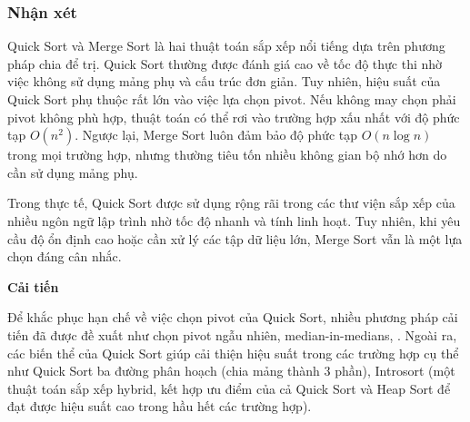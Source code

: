 \subsubsection{Nhận xét}

Quick Sort và Merge Sort là hai thuật toán sắp xếp nổi tiếng dựa trên phương pháp chia để trị. Quick Sort thường được đánh giá cao về tốc độ thực thi nhờ việc không sử dụng mảng phụ và cấu trúc đơn giản. Tuy nhiên, hiệu suất của Quick Sort phụ thuộc rất lớn vào việc lựa chọn pivot. Nếu không may chọn phải pivot không phù hợp, thuật toán có thể rơi vào trường hợp xấu nhất với độ phức tạp $O(n^2)$. Ngược lại, Merge Sort luôn đảm bảo độ phức tạp $O(n \log{n})$ trong mọi trường hợp, nhưng thường tiêu tốn nhiều không gian bộ nhớ hơn do cần sử dụng mảng phụ. 

Trong thực tế, Quick Sort được sử dụng rộng rãi trong các thư viện sắp xếp của nhiều ngôn ngữ lập trình nhờ tốc độ nhanh và tính linh hoạt. Tuy nhiên, khi yêu cầu độ ổn định cao hoặc cần xử lý các tập dữ liệu lớn, Merge Sort vẫn là một lựa chọn đáng cân nhắc.

\textbf{Cải tiến}

Để khắc phục hạn chế về việc chọn pivot của Quick Sort, nhiều phương pháp cải tiến đã được đề xuất như chọn pivot ngẫu nhiên, median-in-medians, . Ngoài ra, các biến thể của Quick Sort giúp cải thiện hiệu suất trong các trường hợp cụ thể như Quick Sort ba đường phân hoạch (chia mảng thành 3 phần), Introsort (một thuật toán sắp xếp hybrid, kết hợp ưu điểm của cả Quick Sort và Heap Sort để đạt được hiệu suất cao trong hầu hết các trường hợp).

